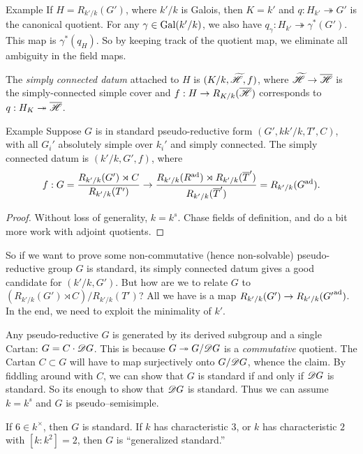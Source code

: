 \begin{enonce}[remark]{Example}
If $H=R_{k'/k}(G')$, where $k'/k$ is Galois, then $K=k'$ and 
$q:H_{k'}\twoheadrightarrow G'$ is the canonical quotient. For any 
$\gamma\in \operatorname{Gal}(k'/k)$, we also have 
$q_\gamma:H_{k'}\twoheadrightarrow \gamma^\ast (G')$. This map is 
$\gamma^\ast(q_H)$. So by keeping track of the quotient map, we eliminate all 
ambiguity in the field maps. 
\end{enonce}

\begin{defi}
The \emph{simply connected datum} attached to $H$ is $(K/k,\widetilde{\mathscr{H}},f)$, 
where $\widetilde{\mathscr{H}}\to \overline{\mathscr{H}}$ is the simply-connected simple cover and 
$f:H\to R_{K/k}(\overline{\mathscr{H}})$ corresponds to 
$q:H_K \twoheadrightarrow\overline{\mathscr{H}}$. 
\end{defi}

\begin{enonce}[remark]{Example}
Suppose $G$ is in standard pseudo-reductive form $(G',kk'/k,T',C)$, with all 
$G_i'$ absolutely simple over $k_i'$ and simply connected. The simply connected 
datum is $(k'/k,G',f)$, where 
\[
  f:G=\frac{R_{k'/k}(G')\rtimes C}{R_{k'/k}(T')} \to \frac{R_{k'/k}(R^{\operatorname{ad}})\rtimes R_{k'/k}(\overline T')}{R_{k'/k}(\overline T')} = R_{k'/k}(G^{\operatorname{ad}}) .
\]
\end{enonce}
\begin{proof}
Without loss of generality, $k=k^s$. Chase fields of definition, and do a bit 
more work with adjoint quotients. 
\end{proof}

So if we want to prove some non-commutative (hence non-solvable) 
pseudo-reductive group $G$ is standard, its simply connected datum gives a good 
candidate for $(k'/k,G')$. But how are we to relate $G$ to 
$(R_{k'/k}(G')\rtimes C)/R_{k'/k}(T')$? All we have is a map 
$R_{k'/k}(G') \to R_{k'/k}({G'}^{\operatorname{ad}})$. In the end, we need to exploit the 
minimality of $k'$. 

Any pseudo-reductive $G$ is generated by its derived subgroup and a single 
Cartan: $G=C\cdot \mathscr{D} G$. This is because $G\twoheadrightarrow G/\mathscr{D} G$ is 
a \emph{commutative} quotient. The Cartan $C\subset G$ will have to map 
surjectively onto $G/\mathscr{D} G$, whence the claim. By fiddling around with $C$, we 
can show that $G$ is standard if and only if $\mathscr{D} G$ is standard. 
So its enough to show that $\mathscr{D} G$ is standard. Thus we can assume 
$k=k^s$ and $G$ is pseudo--semisimple. 

\begin{theo}
If $6\in k^\times$, then $G$ is standard. If $k$ has characteristic $3$, or 
$k$ has characteristic $2$ with $[k:k^2]=2$, then $G$ is ``generalized 
standard.'' 
\end{theo}


